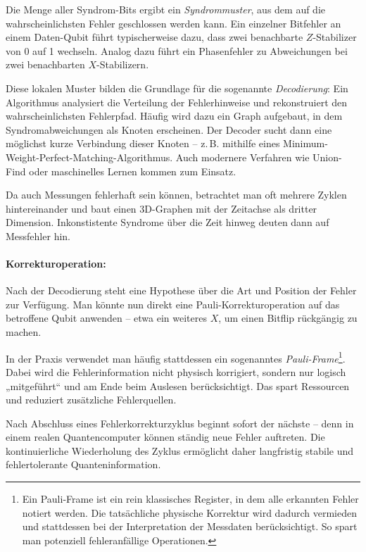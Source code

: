 Die Menge aller Syndrom-Bits ergibt ein \emph{Syndrommuster}, aus dem auf die wahrscheinlichsten Fehler geschlossen werden kann. Ein einzelner Bitfehler an einem Daten-Qubit führt typischerweise dazu, dass zwei benachbarte \(Z\)-Stabilizer von 0 auf 1 wechseln. Analog dazu führt ein Phasenfehler zu Abweichungen bei zwei benachbarten \(X\)-Stabilizern.

Diese lokalen Muster bilden die Grundlage für die sogenannte \emph{Decodierung}: Ein Algorithmus analysiert die Verteilung der Fehlerhinweise und rekonstruiert den wahrscheinlichsten Fehlerpfad. Häufig wird dazu ein Graph aufgebaut, in dem Syndromabweichungen als Knoten erscheinen. Der Decoder sucht dann eine möglichst kurze Verbindung dieser Knoten – z.\,B. mithilfe eines Minimum-Weight-Perfect-Matching-Algorithmus. Auch modernere Verfahren wie Union-Find oder maschinelles Lernen kommen zum Einsatz.

Da auch Messungen fehlerhaft sein können, betrachtet man oft mehrere Zyklen hintereinander und baut einen 3D-Graphen mit der Zeitachse als dritter Dimension. Inkonstistente Syndrome über die Zeit hinweg deuten dann auf Messfehler hin.

\paragraph{Korrekturoperation:}

Nach der Decodierung steht eine Hypothese über die Art und Position der Fehler zur Verfügung. Man könnte nun direkt eine Pauli-Korrekturoperation auf das betroffene Qubit anwenden – etwa ein weiteres \(X\), um einen Bitflip rückgängig zu machen.

In der Praxis verwendet man häufig stattdessen ein sogenanntes \emph{Pauli-Frame}\footnote{Ein Pauli-Frame ist ein rein klassisches Register, in dem alle erkannten Fehler notiert werden. Die tatsächliche physische Korrektur wird dadurch vermieden und stattdessen bei der Interpretation der Messdaten berücksichtigt. So spart man potenziell fehleranfällige Operationen.}. Dabei wird die Fehlerinformation nicht physisch korrigiert, sondern nur logisch „mitgeführt“ und am Ende beim Auslesen berücksichtigt. Das spart Ressourcen und reduziert zusätzliche Fehlerquellen.

Nach Abschluss eines Fehlerkorrekturzyklus beginnt sofort der nächste – denn in einem realen Quantencomputer können ständig neue Fehler auftreten. Die kontinuierliche Wiederholung des Zyklus ermöglicht daher langfristig stabile und fehlertolerante Quanteninformation.\\

